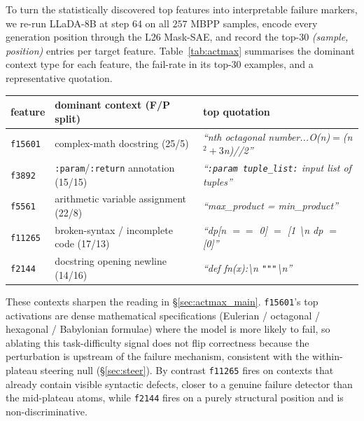 \documentclass[11pt]{article}
\makeatletter
\renewcommand{\arraystretch}{0.96}
\providecommand{\linenumbers}{}
\providecommand{\nolinenumbers}{}
\let\old@table\table
\let\old@endtable\endtable
\renewenvironment{table}[1][]{%
  \nolinenumbers\old@table[#1]%
}{%
  \old@endtable\linenumbers%
}
\makeatother
\begin{document}
To turn the statistically discovered top features into interpretable failure markers, we re-run LLaDA-8B at step 64 on all $257$ MBPP samples, encode every generation position through the L26 Mask-SAE, and record the top-$30$ \emph{(sample, position)} entries per target feature.
Table~\ref{tab:actmax} summarises the dominant context type for each feature, the fail-rate in its top-$30$ examples, and a representative quotation.

\begin{table}[t]
  \centering\scriptsize
  \setlength{\tabcolsep}{3pt}
  \renewcommand{\arraystretch}{1.05}
  \begin{tabular}{@{}l p{} p{}@{}}
    \toprule
    feature & dominant context (F/P split) & top quotation \\
    \midrule
    \texttt{f15601} & complex-math docstring (25/5) & \emph{``nth octagonal number...O(n)$=$(n$^2{+}3$n)//2''} \\
    \texttt{f3892}  & \texttt{:param}/\texttt{:return} annotation (15/15) & \emph{``\texttt{:param tuple\_list:} input list of tuples''} \\
    \texttt{f5561}  & arithmetic variable assignment (22/8) & \emph{``max\_product = min\_product''} \\
    \texttt{f11265} & broken-syntax / incomplete code (17/13) & \emph{``dp[n $==$ 0] $=$ [1 \textbackslash n dp $=$ [0]''} \\
    \texttt{f2144}  & docstring opening newline (14/16) & \emph{``def fn(x):\textbackslash n \texttt{"""}\textbackslash n''} \\
    \bottomrule
  \end{tabular}
  \caption{Activation-maximising contexts for the top fail-enriched features on LLaDA-8B / MBPP at step 64; fail/pass counts are among each feature's top-$30$ examples. \texttt{f15601} fires on complex-math docstring contexts (task-difficulty correlate), \texttt{f11265} fires on broken-syntax contexts (closer to a true failure detector), and \texttt{f2144} fires on a structural position (non-discriminative).}
  \label{tab:actmax}
\end{table}

These contexts sharpen the reading in \S\ref{sec:actmax_main}.
\texttt{f15601}'s top activations are dense mathematical specifications (Eulerian / octagonal / hexagonal / Babylonian formulae) where the model is more likely to fail, so ablating this task-difficulty signal does not flip correctness because the perturbation is upstream of the failure mechanism, consistent with the within-plateau steering null (\S\ref{sec:steer}).
By contrast \texttt{f11265} fires on contexts that already contain visible syntactic defects, closer to a genuine failure detector than the mid-plateau atoms, while \texttt{f2144} fires on a purely structural position and is non-discriminative.
\end{document}
